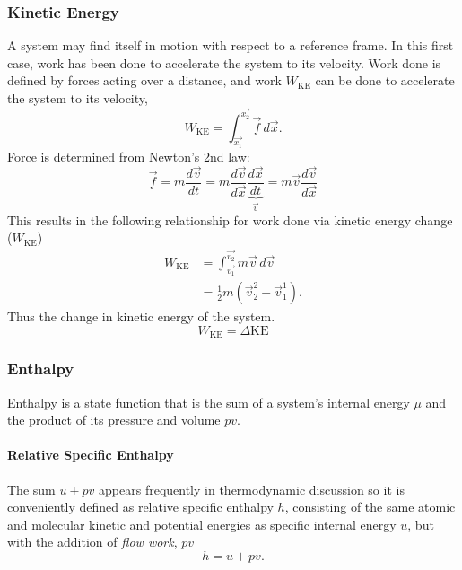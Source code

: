 \subsubsection{Kinetic Energy}
A system may find itself in motion with respect to a reference frame. In this first case, work has been done to
accelerate the system to its velocity. Work done is defined by forces acting over a distance, and work $W_{\text{KE}}$ can be done to accelerate the system to its velocity,
\begin{equation}
W_{\text{KE}}=\int_{\vec{x_1}}^{\vec{x_2}}\vec{f}\,d\vec{x}.
\end{equation}
Force is determined from Newton's 2nd law:
\begin{equation}
\vec{f}=m\frac{d\vec{v}}{dt}=m\frac{d\vec{v}}{d\vec{x}}\underbrace{\frac{d\vec{x}}{dt}}_{\vec{v}}=m\vec{v}\frac{d\vec{v}}{d\vec{x}}
\end{equation}
This results in the following relationship for work done via kinetic energy change ($W_{\text{KE}}$)
\begin{equation}\label{eq:KE}
\begin{split}
W_{\text{KE}}&=\int_{\vec{v_1}}^{\vec{v_2}}m\vec{v}\,d\vec{v}\\
&=\frac{1}{2}m(\vec{v}_2^2-\vec{v}_1^1).
\end{split}
\end{equation}
Thus the change in kinetic energy of the system.
\begin{equation}
    W_{\text{KE}}=\Delta \text{KE}
\end{equation}

\subsubsection{Enthalpy}
Enthalpy is a state function that is the sum of a system's internal energy $\mu$ and the product of its pressure and volume $pv$.
\paragraph{Relative Specific Enthalpy}
The sum $u+pv$ appears frequently in thermodynamic discussion so it is conveniently defined as relative specific enthalpy $h$, consisting of the same atomic and molecular kinetic and potential energies as specific internal energy $u$, but with the addition of \emph{flow work}, $pv$
\begin{equation}
\label{eqn:RelativeEnthalpy}
h=u+pv.
\end{equation}
\subsection{}
